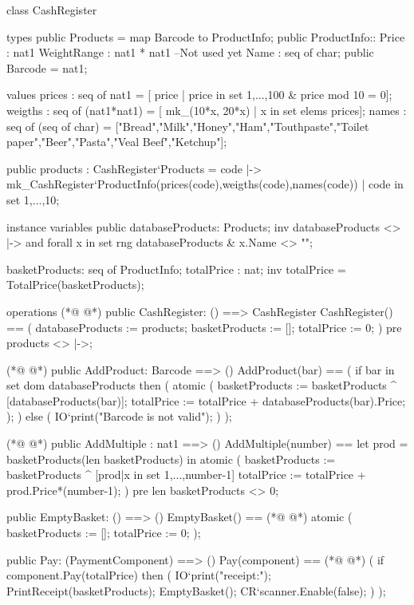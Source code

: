 \begin{vdmpp}
class CashRegister

types
 public Products = map Barcode to ProductInfo;
 public ProductInfo::  Price : nat1
            WeightRange : nat1 * nat1 --Not used yet
            Name : seq of char;
 public Barcode = nat1;

values
 prices : seq of nat1 = [ price | price in set {1,...,100} & price mod 10 = 0];
 weigths : seq of (nat1*nat1) = [ mk_(10*x, 20*x) | x in set elems prices];
 names : seq of (seq of char) = ["Bread","Milk","Honey","Ham","Touthpaste","Toilet paper","Beer","Pasta","Veal Beef","Ketchup"];
 
 public products : CashRegister`Products = {code |-> mk_CashRegister`ProductInfo(prices(code),weigths(code),names(code)) 
          | code in set {1,...,10}}; 
 
instance variables
 public databaseProducts: Products;
  inv databaseProducts <> {|->} and 
   forall x in set rng databaseProducts &
    x.Name <> "";
   
 basketProducts: seq of ProductInfo;
 totalPrice : nat;
  inv totalPrice = TotalPrice(basketProducts); 
 
operations
(*@
\label{CashRegister:29}
@*)
 public CashRegister: () ==> CashRegister
 CashRegister() ==
  (
   databaseProducts := products;
   basketProducts := [];
   totalPrice := 0;
  )
  pre products <> {|->};

(*@
\label{AddProduct:38}
@*)
 public AddProduct: Barcode ==> ()
 AddProduct(bar) ==
  (
   if bar in set dom databaseProducts then
   (
    atomic
    (
     basketProducts := basketProducts ^ [databaseProducts(bar)];
     totalPrice := totalPrice + databaseProducts(bar).Price;
    );
   )
   else 
   (
    IO`print("Barcode is not valid\n");
   )
  );

(*@
\label{AddMultiple:55}
@*)
 public AddMultiple : nat1 ==> ()
 AddMultiple(number) == 
  let prod = basketProducts(len basketProducts) 
   in  
    atomic
    (
      basketProducts := basketProducts ^ [prod|x in set {1,...,number-1}]
      totalPrice := totalPrice + prod.Price*(number-1);
    )
  pre len basketProducts <> 0;
 

 public EmptyBasket: () ==> ()
 EmptyBasket() ==
(*@
\label{EmptyBasket:69}
@*)
  atomic
  (
   basketProducts := [];
   totalPrice := 0;
  );
  
 public Pay: (PaymentComponent) ==> ()
 Pay(component) ==
(*@
\label{Pay:77}
@*)
  (
   if component.Pay(totalPrice) then
   (
    IO`print("\nPayment receipt:\n");
    PrintReceipt(basketProducts);
    EmptyBasket();
    CR`scanner.Enable(false);
   )
  );
  

\end{vdmpp}
